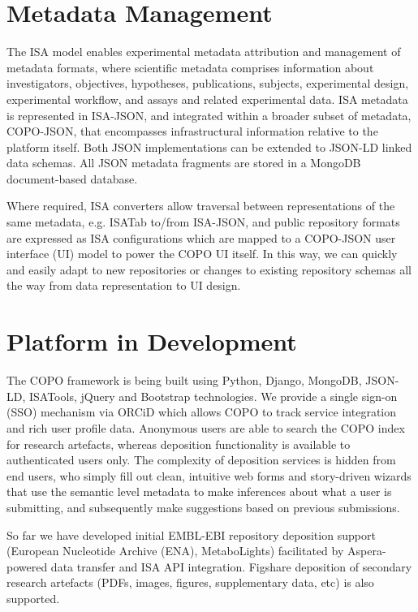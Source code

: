 \documentclass[runningheads,a4paper]{llncs}
\begin{document}
\vspace*{-0.3in}
\section{Metadata Management}
\vspace*{-0.1in} The ISA model enables experimental metadata
attribution and management of metadata formats, where scientific
metadata comprises information about investigators, objectives,
hypotheses, publications, subjects, experimental design, experimental
workflow, and assays and related experimental data. ISA metadata is
represented in ISA-JSON, and integrated within a broader subset of
metadata, COPO-JSON, that encompasses infrastructural information
relative to the platform itself. Both JSON implementations can be
extended to JSON-LD linked data schemas. All JSON metadata fragments
are stored in a MongoDB document-based database.

Where required, ISA converters allow traversal between representations
of the same metadata, e.g. ISATab to/from ISA-JSON, and public
repository formats are expressed as ISA configurations which are
mapped to a COPO-JSON user interface (UI) model to power the COPO UI
itself. In this way, we can quickly and easily adapt to new
repositories or changes to existing repository schemas all the way
from data representation to UI design.

\vspace*{-0.1in}
\section{Platform in Development}
\vspace*{-0.1in} The COPO framework is being built using Python,
Django, MongoDB, JSON-LD, ISATools, jQuery and Bootstrap
technologies. We provide a single sign-on (SSO) mechanism via ORCiD
which allows COPO to track service integration and rich user profile
data. Anonymous users are able to search the COPO index for research
artefacts, whereas deposition functionality is available to
authenticated users only. The complexity of deposition services is
hidden from end users, who simply fill out clean, intuitive web forms
and story-driven wizards that use the semantic level metadata to make
inferences about what a user is submitting, and subsequently make
suggestions based on previous submissions.

So far we have developed initial EMBL-EBI repository deposition
support (European Nucleotide Archive (ENA), MetaboLights) facilitated
by Aspera-powered data transfer and ISA API integration. Figshare
deposition of secondary research artefacts (PDFs, images, figures,
supplementary data, etc) is also supported.
\end{document}
